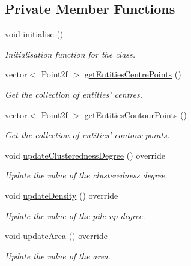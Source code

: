 \subsection*{\-Private \-Member \-Functions}
\begin{DoxyCompactItemize}
\item 
void \hyperlink{classmultiscale_1_1analysis_1_1Cluster_a3af6980def4fbfea38ccd86620f127f8}{initialise} ()
\begin{DoxyCompactList}\small\item\em \-Initialisation function for the class. \end{DoxyCompactList}\item 
vector$<$ \-Point2f $>$ \hyperlink{classmultiscale_1_1analysis_1_1Cluster_af24261b08126bc2d2f51144056c6d353}{get\-Entities\-Centre\-Points} ()
\begin{DoxyCompactList}\small\item\em \-Get the collection of entities' centres. \end{DoxyCompactList}\item 
vector$<$ \-Point2f $>$ \hyperlink{classmultiscale_1_1analysis_1_1Cluster_adbb1a108b2ae638fbba0450c7f7fee20}{get\-Entities\-Contour\-Points} ()
\begin{DoxyCompactList}\small\item\em \-Get the collection of entities' contour points. \end{DoxyCompactList}\item 
void \hyperlink{classmultiscale_1_1analysis_1_1Cluster_a2279d1567eec7c0b1e29cae26cfb4d73}{update\-Clusteredness\-Degree} () override
\begin{DoxyCompactList}\small\item\em \-Update the value of the clusteredness degree. \end{DoxyCompactList}\item 
void \hyperlink{classmultiscale_1_1analysis_1_1Cluster_ac0300d9d05b0eb3aecd5724a14c2da41}{update\-Density} () override
\begin{DoxyCompactList}\small\item\em \-Update the value of the pile up degree. \end{DoxyCompactList}\item 
void \hyperlink{classmultiscale_1_1analysis_1_1Cluster_a3128a3b20c28619ccdd6a25208b8c83e}{update\-Area} () override
\begin{DoxyCompactList}\small\item\em \-Update the value of the area. \end{DoxyCompactList}\item 

\end{DoxyCompactItemize}
